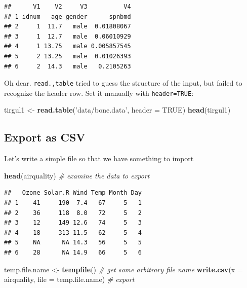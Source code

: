 \documentclass[]{book}
\newenvironment{Shaded}{\begin{snugshade}}{\end{snugshade}}
\newcommand{\KeywordTok}[1]{\textcolor[rgb]{0.13,0.29,0.53}{\textbf{#1}}}
\newcommand{\DataTypeTok}[1]{\textcolor[rgb]{0.13,0.29,0.53}{#1}}
\newcommand{\StringTok}[1]{\textcolor[rgb]{0.31,0.60,0.02}{#1}}
\newcommand{\CommentTok}[1]{\textcolor[rgb]{0.56,0.35,0.01}{\textit{#1}}}
\newcommand{\OtherTok}[1]{\textcolor[rgb]{0.56,0.35,0.01}{#1}}
\newcommand{\NormalTok}[1]{#1}
\theoremstyle{definition}
\theoremstyle{definition}
\theoremstyle{definition}
\theoremstyle{remark}
\begin{document}
\begin{verbatim}
##      V1    V2     V3          V4
## 1 idnum   age gender      spnbmd
## 2     1  11.7   male  0.01808067
## 3     1  12.7   male  0.06010929
## 4     1 13.75   male 0.005857545
## 5     2 13.25   male  0.01026393
## 6     2  14.3   male   0.2105263
\end{verbatim}

Oh dear. \texttt{read.,table} tried to guess the structure of the input,
but failed to recognize the header row. Set it manually with
\texttt{header=TRUE}:

\begin{Shaded}
\begin{Highlighting}[]
\NormalTok{tirgul1 <-}\StringTok{ }\KeywordTok{read.table}\NormalTok{(}\StringTok{'data/bone.data'}\NormalTok{, }\DataTypeTok{header =} \OtherTok{TRUE}\NormalTok{) }
\KeywordTok{head}\NormalTok{(tirgul1)}
\end{Highlighting}
\end{Shaded}

\subsection{Export as CSV}\label{export-as-csv}

Let's write a simple file so that we have something to import

\begin{Shaded}
\begin{Highlighting}[]
\KeywordTok{head}\NormalTok{(airquality) }\CommentTok{#  examine the data to export}
\end{Highlighting}
\end{Shaded}

\begin{verbatim}
##   Ozone Solar.R Wind Temp Month Day
## 1    41     190  7.4   67     5   1
## 2    36     118  8.0   72     5   2
## 3    12     149 12.6   74     5   3
## 4    18     313 11.5   62     5   4
## 5    NA      NA 14.3   56     5   5
## 6    28      NA 14.9   66     5   6
\end{verbatim}

\begin{Shaded}
\begin{Highlighting}[]
\NormalTok{temp.file.name <-}\StringTok{ }\KeywordTok{tempfile}\NormalTok{() }\CommentTok{# get some arbitrary file name}
\KeywordTok{write.csv}\NormalTok{(}\DataTypeTok{x =}\NormalTok{ airquality, }\DataTypeTok{file =}\NormalTok{ temp.file.name) }\CommentTok{# export}
\end{Highlighting}
\end{Shaded}
\end{document}

